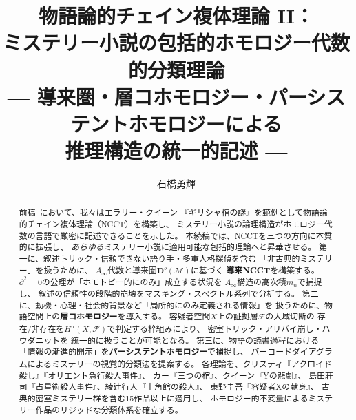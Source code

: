 \documentclass[12pt,twocolumn]{ltjsarticle}
\newcommand{\Mys}{\mathcal{M}}
\newcommand{\Db}{\mathbf{D}^b}
\begin{document}
\title{
  \textbf{物語論的チェイン複体理論 II：}\\[2pt]
  \textbf{ミステリー小説の包括的ホモロジー代数的分類理論}\\[8pt]
  {\normalsize --- 導来圏・層コホモロジー・パーシステントホモロジーによる}\\[2pt]
  {\normalsize 推理構造の統一的記述 ---}
}

\author{
  石橋勇輝
}

\date{}

\maketitle

\begin{abstract}
\noindent
前稿~\cite{Ishibashi2026I}において、我々はエラリー・クイーン
『ギリシャ棺の謎』を範例として物語論的チェイン複体理論（NCCT）を構築し、
ミステリー小説の論理構造がホモロジー代数の言語で厳密に記述できることを示した。
本続稿では、NCCTを三つの方向に本質的に拡張し、
\emph{あらゆる}ミステリー小説に適用可能な包括的理論へと昇華させる。
第一に、叙述トリック・信頼できない語り手・多重人格探偵を含む
「非古典的ミステリー」を扱うために、
$A_\infty$代数と導来圏$\Db(\Mys)$に基づく
\textbf{導来NCCT}を構築する。
$\partial^2 = 0$の公理が「ホモトピー的にのみ」成立する状況を
$A_\infty$構造の高次積$m_n$で捕捉し、
叙述の信頼性の段階的崩壊をマスキング・スペクトル系列で分析する。
第二に、動機・心理・社会的背景など「局所的にのみ定義される情報」を
扱うために、物語空間上の\textbf{層コホモロジー}を導入する。
容疑者空間$X$上の証拠層$\mathcal{F}$の大域切断の
存在/非存在を$H^n(X, \mathcal{F})$で判定する枠組みにより、
密室トリック・アリバイ崩し・ハウダニットを
統一的に扱うことが可能となる。
第三に、物語の読書過程における
「情報の漸進的開示」を\textbf{パーシステントホモロジー}で捕捉し、
バーコードダイアグラムによるミステリーの視覚的分類法を提案する。
各理論を、クリスティ『アクロイド殺し』『オリエント急行殺人事件』、
カー『三つの棺』、クイーン『Yの悲劇』、
島田荘司『占星術殺人事件』、綾辻行人『十角館の殺人』、
東野圭吾『容疑者Xの献身』、
古典的密室ミステリー群を含む15作品以上に適用し、
ホモロジー的不変量によるミステリー作品のリジッドな分類体系を確立する。
\end{abstract}


\end{document}
